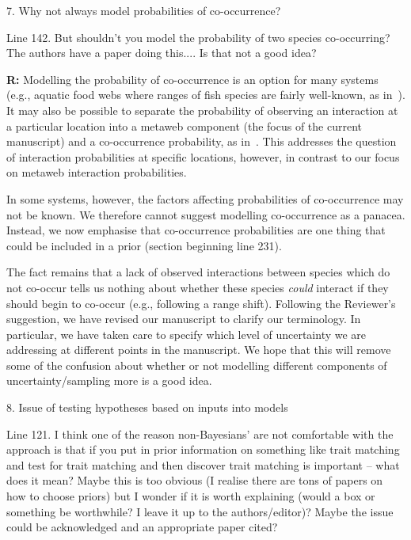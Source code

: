 \documentclass[12pt]{letter}
\newenvironment{refquote}{\bigskip \begin{it}}{\end{it}\smallskip}
\begin{document}
	7. Why not always model probabilities of co-occurrence?


		\begin{refquote}
		Line 142.  But shouldn't you model the probability of two species co-occurring?  The authors have a paper doing this.... Is that not a good idea?
		\end{refquote}


		\textbf{R:} Modelling the probability of co-occurrence is an option for many systems (e.g., aquatic food webs where ranges of fish species are fairly well-known, as in~\citet{Gravel2013}). It may also be possible to separate the probability of observing an interaction at a particular location into a metaweb component (the focus of the current manuscript) and a co-occurrence probability, as in~\citep{Gravel2018}. This addresses the question of interaction probabilities at specific locations, however, in contrast to our focus on metaweb interaction probabilities.


		In some systems, however, the factors affecting probabilities of co-occurrence may not be known. We therefore cannot suggest modelling co-occurrence as a panacea. Instead, we now emphasise that co-occurrence probabilities are one thing that could be included in a prior (section beginning line 231). 


		The fact remains that a lack of observed interactions between species which do not co-occur tells us nothing about whether these species \emph{could} interact if they should begin to co-occur (e.g., following a range shift). Following the Reviewer's suggestion, we have revised our manuscript to clarify our terminology. In particular, we have taken care to specify which level of uncertainty we are addressing at different points in the manuscript. We hope that this will remove some of the confusion about whether or not modelling different components of uncertainty/sampling more is a good idea. 


	8. Issue of testing hypotheses based on inputs into models 


		\begin{refquote}
		Line 121.  I think one of the reason non-Bayesians' are not comfortable with the approach is that if you put in prior information on something like trait matching and test for trait matching and then discover trait matching is important – what does it mean?  Maybe this is too obvious (I realise there are tons of papers on how to choose priors) but I wonder if it is worth explaining (would a box or something be worthwhile?  I leave it up to the authors/editor)?  Maybe the issue could be acknowledged and an appropriate paper cited?
		\end{refquote}
\end{document}
